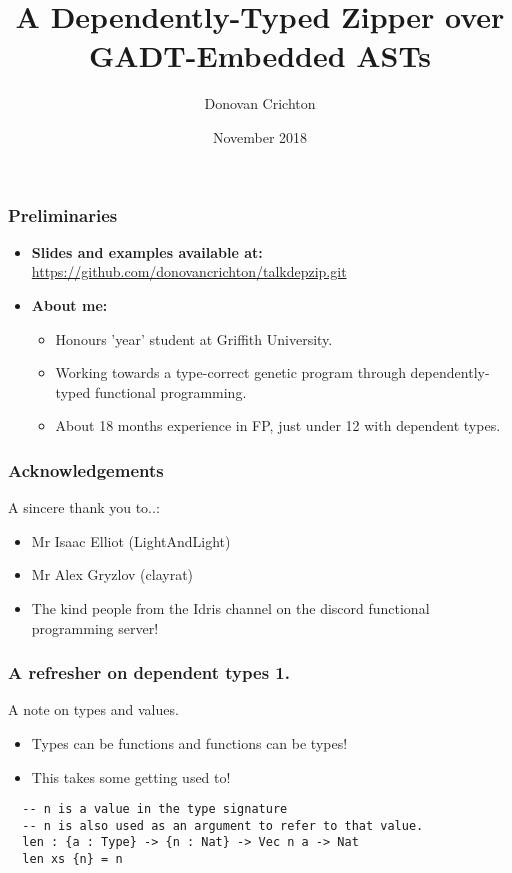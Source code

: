 \documentclass{beamer}
\title{A Dependently-Typed Zipper over GADT-Embedded ASTs}
\author{Donovan Crichton}
\date{November 2018}
\begin{document}
 
\frame{\titlepage}

\begin{frame}[fragile]
  \frametitle{Preliminaries}
  \begin{itemize}
    \item \textbf{Slides and examples available at:}
    \url{https://github.com/donovancrichton/talkdepzip.git}
  \item \textbf{About me:}
    \begin{itemize}
      \item Honours 'year' student at Griffith University.
      \item Working towards a type-correct genetic program through
              dependently-typed functional programming.
      \item About 18 months experience in FP, just under 12 with
              dependent types.
    \end{itemize}
  \end{itemize}
\end{frame}

\begin{frame}[fragile]
  \frametitle{Acknowledgements}
  \begin{block}{A sincere thank you to..:}
    \begin{itemize}
      \item Mr Isaac Elliot (LightAndLight)
      \item Mr Alex Gryzlov (clayrat)
      \item The kind people from the Idris channel 
        on the discord functional programming server!
    \end{itemize}
  \end{block}
\end{frame}

\begin{frame}[fragile]
  \frametitle{A refresher on dependent types 1.}
  \begin{block}{A note on types and values.}
    \begin{itemize}
    \item Types can be functions and functions can be types!
    \item This takes some getting used to!
    \end{itemize}
  \end{block}
  \begin{verbatim}
  -- n is a value in the type signature
  -- n is also used as an argument to refer to that value.
  len : {a : Type} -> {n : Nat} -> Vec n a -> Nat
  len xs {n} = n
  \end{verbatim}
\end{frame}
\end{document}
